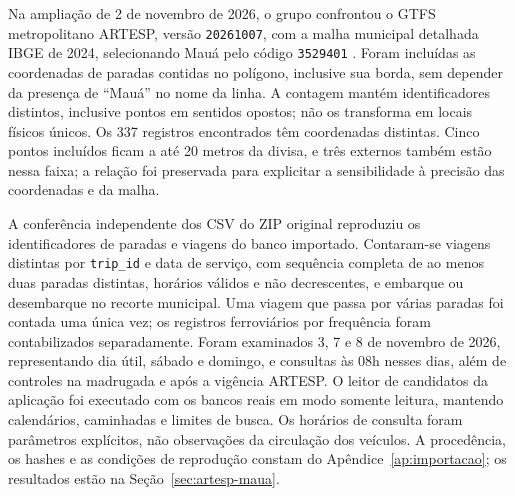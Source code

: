 Na ampliação de 2 de novembro de 2026, o grupo confrontou o GTFS metropolitano ARTESP, versão \texttt{20261007}, com a malha municipal detalhada IBGE de 2024, selecionando Mauá pelo código \texttt{3529401} \citep{artespgtfs2026,ibgemalha2024}. Foram incluídas as coordenadas de paradas contidas no polígono, inclusive sua borda, sem depender da presença de ``Mauá'' no nome da linha. A contagem mantém identificadores distintos, inclusive pontos em sentidos opostos; não os transforma em locais físicos únicos. Os 337 registros encontrados têm coordenadas distintas. Cinco pontos incluídos ficam a até 20 metros da divisa, e três externos também estão nessa faixa; a relação foi preservada para explicitar a sensibilidade à precisão das coordenadas e da malha.

A conferência independente dos CSV do ZIP original reproduziu os identificadores de paradas e viagens do banco importado. Contaram-se viagens distintas por \texttt{trip\_id} e data de serviço, com sequência completa de ao menos duas paradas distintas, horários válidos e não decrescentes, e embarque ou desembarque no recorte municipal. Uma viagem que passa por várias paradas foi contada uma única vez; os registros ferroviários por frequência foram contabilizados separadamente. Foram examinados 3, 7 e 8 de novembro de 2026, representando dia útil, sábado e domingo, e consultas às 08h nesses dias, além de controles na madrugada e após a vigência ARTESP. O leitor de candidatos da aplicação foi executado com os bancos reais em modo somente leitura, mantendo calendários, caminhadas e limites de busca. Os horários de consulta foram parâmetros explícitos, não observações da circulação dos veículos. A procedência, os hashes e as condições de reprodução constam do Apêndice~\ref{ap:importacao}; os resultados estão na Seção~\ref{sec:artesp-maua}.
